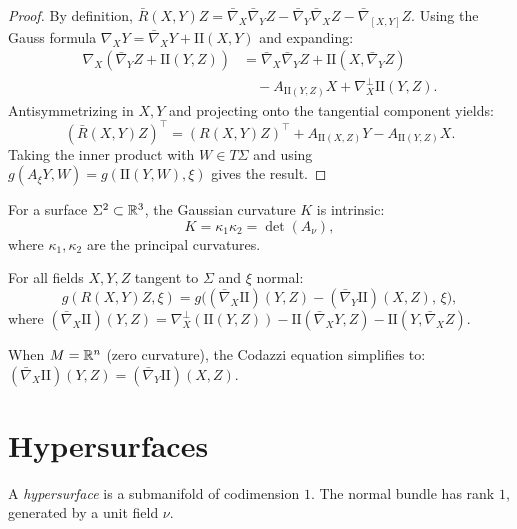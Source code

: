 \begin{proof}
By definition, $\bar{R}(X,Y)Z = \bar{\nabla}_X \bar{\nabla}_Y Z
- \bar{\nabla}_Y \bar{\nabla}_X Z - \bar{\nabla}_{[X,Y]} Z$. Using the Gauss
formula $\nabla_X Y = \bar{\nabla}_X Y + \mathrm{I\!I}(X, Y)$ and expanding:
\begin{align*}
    \nabla_X(\bar{\nabla}_Y Z + \mathrm{I\!I}(Y,Z))
    &= \bar{\nabla}_X \bar{\nabla}_Y Z + \mathrm{I\!I}(X, \bar{\nabla}_Y Z) \\
    &\quad - A_{\mathrm{I\!I}(Y,Z)} X + \nabla_X^\perp \mathrm{I\!I}(Y,Z).
\end{align*}
Antisymmetrizing in $X, Y$ and projecting onto the tangential component yields:
\[
    (\bar{R}(X,Y)Z)^\top = (R(X,Y)Z)^\top + A_{\mathrm{I\!I}(X,Z)}Y - A_{\mathrm{I\!I}(Y,Z)}X.
\]
Taking the inner product with $W \in T\Sigma$ and using
$g(A_\xi Y, W) = g(\mathrm{I\!I}(Y,W), \xi)$ gives the result.
\end{proof}

\begin{corollary}
For a surface $\Sigma^2 \subset \mathbb{R}^3$, the Gaussian curvature $K$ is intrinsic:
\[
    K = \kappa_1 \kappa_2 = \det(A_\nu),
\]
where $\kappa_1, \kappa_2$ are the principal curvatures.
\end{corollary}

\begin{theorem}
\label{thm:codazzi}
For all fields $X, Y, Z$ tangent to $\Sigma$ and $\xi$ normal:
\[
    g(R(X, Y)Z, \xi) = g\bigl((\bar{\nabla}_X \mathrm{I\!I})(Y, Z)
    - (\bar{\nabla}_Y \mathrm{I\!I})(X, Z),\, \xi\bigr),
\]
where $(\bar{\nabla}_X \mathrm{I\!I})(Y, Z) = \nabla_X^\perp(\mathrm{I\!I}(Y, Z))
- \mathrm{I\!I}(\bar{\nabla}_X Y, Z) - \mathrm{I\!I}(Y, \bar{\nabla}_X Z)$.
\end{theorem}

\begin{remark}
When $M = \mathbb{R}^n$ (zero curvature), the Codazzi equation simplifies to:
$(\bar{\nabla}_X \mathrm{I\!I})(Y,Z) = (\bar{\nabla}_Y \mathrm{I\!I})(X,Z)$.
\end{remark}

\section{Hypersurfaces}

\begin{definition}[Hypersurface]
A \emph{hypersurface} is a submanifold of codimension $1$. The normal bundle has
rank $1$, generated by a unit field $\nu$.
\end{definition}

